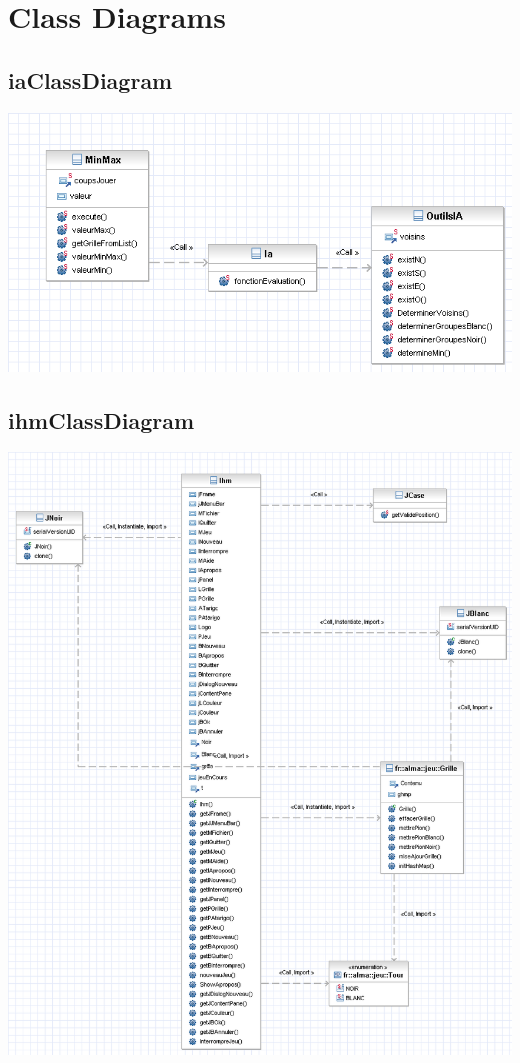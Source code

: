 \documentclass{report}
\begin{document}
\section{Class Diagrams}


\subsection*{iaClassDiagram}
\begin{center}
\includegraphics[scale=0.70]{images/fralmaiaClassDiagram}
\end{center}


\subsection*{ihmClassDiagram}
\begin{center}
\includegraphics[scale=0.30]{images/fralmaihmClassDiagram}
\end{center}
\end{document}
